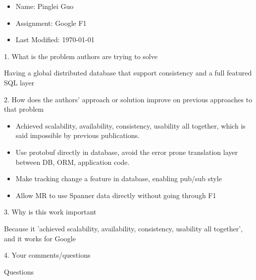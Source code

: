 \documentclass[12pt,a4paper,oneside]{article}
\begin{document}
\begin{itemize}
  \item Name: Pinglei Guo
  \item Assignment: Google F1
  \item Last Modified: \today
\end{itemize}

1. What is the problem authors are trying to solve

\medskip

Having a global distributed database that support consistency and a full featured SQL layer

\bigskip

2. How does the authors’ approach or solution improve on previous approaches to that problem

\medskip

\begin{itemize}
  \item Achieved scalability, availability, consistency, usability all together, which is said impossible by previous publications.
  \item Use protobuf directly in database, avoid the error prone translation layer between DB, ORM, application code.
  \item Make tracking change a feature in database, enabling pub/sub style
  \item Allow MR to use Spanner data directly without going through F1
\end{itemize}

\bigskip

3. Why is this work important

\medskip

Because it 'achieved scalability, availability, consistency, usability all together', and it works for Google

\bigskip

4. Your comments/questions

\medskip

Questions
\end{document}
